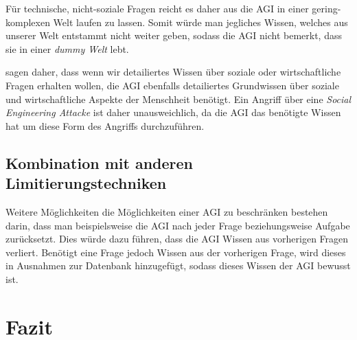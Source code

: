         Für technische, nicht-soziale Fragen reicht es daher aus die AGI in einer gering-komplexen Welt laufen zu lassen.
        \cite[s. 310]{armstrongforthcoming} Somit würde man jegliches Wissen, welches aus unserer Welt entstammt nicht
        weiter geben, sodass die AGI nicht bemerkt, dass sie in einer \textit{dummy Welt} lebt.

        \citealp{armstrongforthcoming} sagen daher, dass wenn wir detailiertes Wissen über soziale oder wirtschaftliche
        Fragen erhalten wollen, die AGI ebenfalls detailiertes Grundwissen über soziale und wirtschaftliche Aspekte der
        Menschheit benötigt. Ein Angriff über eine \textit{Social Engineering Attacke} ist daher unausweichlich, da die
        AGI das benötigte Wissen hat um diese Form des Angriffs durchzuführen.\cite[s. 310]{armstrongforthcoming}


        \subsection{Kombination mit anderen Limitierungstechniken}
        Weitere Möglichkeiten die Möglichkeiten einer AGI zu beschränken bestehen darin, dass man beispielsweise die
        AGI nach jeder Frage beziehungsweise Aufgabe zurücksetzt.\cite[s. 309]{armstrongforthcoming} Dies würde dazu
        führen, dass die AGI Wissen aus vorherigen Fragen verliert. Benötigt eine Frage jedoch Wissen aus der vorherigen
        Frage, wird dieses in Ausnahmen zur Datenbank hinzugefügt, sodass dieses Wissen der AGI bewusst ist.

    \section{Fazit}


    \newpage
    
    






